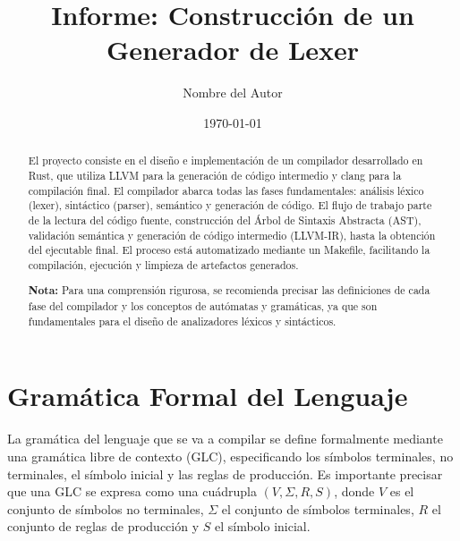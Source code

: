 \documentclass[a4paper,12pt]{article}
\title{Informe: Construcción de un Generador de Lexer}
\author{Nombre del Autor}
\date{\today}
\begin{document}
\maketitle

\begin{abstract}

El proyecto consiste en el diseño e implementación de un compilador desarrollado en Rust, que utiliza LLVM para la generación de código intermedio y clang para la compilación final. El compilador abarca todas las fases fundamentales: análisis léxico (lexer), sintáctico (parser), semántico y generación de código. El flujo de trabajo parte de la lectura del código fuente, construcción del Árbol de Sintaxis Abstracta (AST), validación semántica y generación de código intermedio (LLVM-IR), hasta la obtención del ejecutable final. El proceso está automatizado mediante un Makefile, facilitando la compilación, ejecución y limpieza de artefactos generados.

\vspace{0.5em}
\textbf{Nota:} Para una comprensión rigurosa, se recomienda precisar las definiciones de cada fase del compilador y los conceptos de autómatas y gramáticas, ya que son fundamentales para el diseño de analizadores léxicos y sintácticos.

\end{abstract}

\section{Gramática Formal del Lenguaje}
La gramática del lenguaje que se va a compilar se define formalmente mediante una gramática libre de contexto (GLC), especificando los símbolos terminales, no terminales, el símbolo inicial y las reglas de producción. Es importante precisar que una GLC se expresa como una cuádrupla $(V, \Sigma, R, S)$, donde $V$ es el conjunto de símbolos no terminales, $\Sigma$ el conjunto de símbolos terminales, $R$ el conjunto de reglas de producción y $S$ el símbolo inicial.
\end{document}
